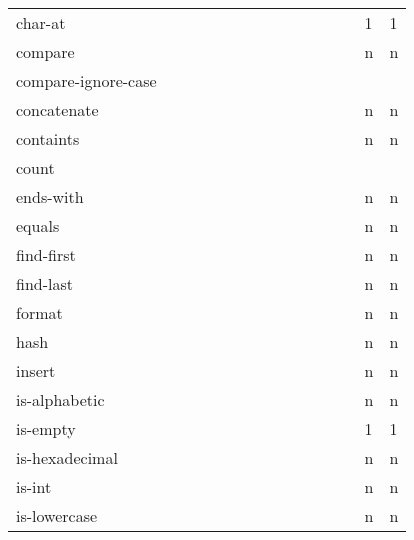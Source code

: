 \documentclass[anonymous,sigplan,review,11pt,nonacm,natbib=false]{acmart}
\begin{document}
\begin{table}
\begin{tabular}{lllllllllllllll}
            char-at &  &  &  &  &  &  &  &  &  &  &  &  & 1 & 1 \\

            compare &  &  &  &  &  &  &  &  &  &  &  &  & n & n \\

            compare-ignore-case &  &  &  &  &  &  &  &  &  &  &  &  &  & \\

            concatenate &  &  &  &  &  &  &  &  &  &  &  &  & n & n \\

            containts &  &  &  &  &  &  &  &  &  &  &  &  & n & n \\

            count &  &  &  &  &  &  &  &  &  &  &  &  &  & \\

            ends-with &  &  &  &  &  &  &  &  &  &  &  &  & n & n \\

            equals &  &  &  &  &  &  &  &  &  &  &  &  & n & n \\

            find-first &  &  &  &  &  &  &  &  &  &  &  &  & n & n \\

            find-last &  &  &  &  &  &  &  &  &  &  &  &  & n & n \\

            format &  &  &  &  &  &  &  &  &  &  &  &  & n & n \\

            hash &  &  &  &  &  &  &  &  &  &  &  &  & n & n \\

            insert &  &  &  &  &  &  &  &  &  &  &  &  & n & n \\

            is-alphabetic &  &  &  &  &  &  &  &  &  &  &  &  & n & n \\

            is-empty &  &  &  &  &  &  &  &  &  &  &  &  & 1 & 1 \\

            is-hexadecimal &  &  &  &  &  &  &  &  &  &  &  &  & n & n \\

            is-int &  &  &  &  &  &  &  &  &  &  &  &  & n & n \\

            is-lowercase &  &  &  &  &  &  &  &  &  &  &  &  & n & n \\


\end{tabular}
\end{table}
\end{document}

